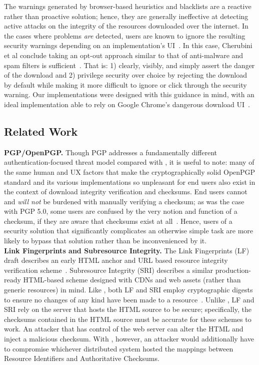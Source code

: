 The warnings generated by browser-based heuristics and blacklists are a reactive
rather than proactive solution; hence, they are generally ineffective at
detecting active attacks on the integrity of the resources downloaded over the
internet. In the cases where problems \emph{are} detected, users are known to
ignore the resulting security warnings depending on an implementation's
UI~\cite{Clickthrough, Modic, Akhawe, ChromeClickThrough}. In this case,
Cherubini et al conclude taking an opt-out approach similar to that of
anti-malware and spam filters is sufficient~\cite{Cherubini}. That is: 1)
clearly, visibly, and simply assert the danger of the download and 2) privilege
security over choice by rejecting the download by default while making it more
difficult to ignore or click through the security warning. Our \SYSTEM{}
implementations were designed with this guidance in mind, with an ideal
implementation able to rely on Google Chrome's dangerous download
UI~\cite{ChromeClickThrough}.

\subsection{Related Work}

\noindent\textbf{PGP/OpenPGP.} Though PGP addresses a fundamentally different
authentication-focused threat model compared with \SYSTEM{}, it is useful to
note: many of the same human and UX factors that make the cryptographically
solid OpenPGP standard and its various implementations so unpleasant for end
users also exist in the context of download integrity verification and
checksums. End users cannot and \textit{will not} be burdened with manually
verifying a checksum; as was the case with PGP 5.0, some users are confused by
the very notion and function of a checksum, if they are aware that checksums
exist at all~\cite{PGPBad, Cherubini}. Hence, users of a security solution that
significantly complicates an otherwise simple task are more likely to bypass
that solution rather than be inconvenienced by it. \\

\noindent\textbf{Link Fingerprints and Subresource Integrity.} The Link
Fingerprints (LF) draft describes an early HTML anchor and URL based resource
integrity verification scheme~\cite{LF}. Subresource Integrity (SRI) describes a
similar production-ready HTML-based scheme designed with CDNs and web assets
(rather than generic resources) in mind. Like \SYSTEM{}, both LF and SRI employ
cryptographic digests to ensure no changes of any kind have been made to a
resource~\cite{SRI}. Unlike \SYSTEM{}, LF and SRI rely on the server that hosts
the HTML source to be secure; specifically, the checksums contained in the HTML
source must be accurate for these schemes to work. An attacker that has control
of the web server can alter the HTML and inject a malicious checksum. With
\SYSTEM{}, however, an attacker would additionally have to compromise whichever
distributed system hosted the mappings between Resource Identifiers and
Authoritative Checksums. \\


